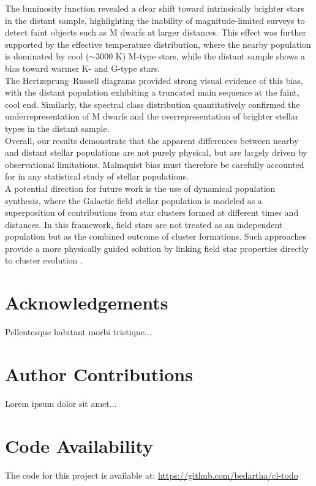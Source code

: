 \documentclass[11pt]{article}
\begin{document}
\noindent The luminosity function revealed a clear shift toward intrinsically brighter stars in the distant sample, highlighting the inability of magnitude-limited surveys to detect faint objects such as M dwarfs at larger distances. This effect was further supported by the effective temperature distribution, where the nearby population is dominated by cool ($\sim$3000 K) M-type stars, while the distant sample shows a bias toward warmer K- and G-type stars.\\

\noindent The Hertzsprung–Russell diagrams provided strong visual evidence of this bias, with the distant population exhibiting a truncated main sequence at the faint, cool end. Similarly, the spectral class distribution quantitatively confirmed the underrepresentation of M dwarfs and the overrepresentation of brighter stellar types in the distant sample.\\

\noindent Overall, our results demonstrate that the apparent differences between nearby and distant stellar populations are not purely physical, but are largely driven by observational limitations. Malmquist bias must therefore be carefully accounted for in any statistical study of stellar populations.\\

\noindent A potential direction for future work is the use of dynamical population synthesis, where the Galactic field stellar population is modeled as a superposition of contributions from star clusters formed at different times and distances. In this framework, field stars are not treated as an independent population but as the combined outcome of cluster formations. Such approaches provide a more physically guided solution by linking field star properties directly to cluster evolution \cite{Marks2011}.

\section{Acknowledgements}
Pellentesque habitant morbi tristique...

\section{Author Contributions}
Lorem ipsum dolor sit amet...

\section{Code Availability}
The code for this project is available at:
\url{https://github.com/bedartha/cl-todo}
\end{document}
